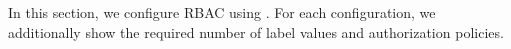 In this section, we configure RBAC  using \labacOneOneOne{}. For each configuration, we additionally show the required number of label values and authorization policies. 

	